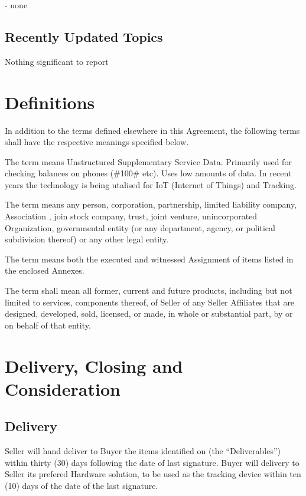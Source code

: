 \documentclass[letterpaper,10pt,english]{sphinxmanual}
\begin{document}
 - none


\subsection{Recently Updated Topics}
\label{\detokenize{releasenotes:recently-updated-topics}}
Nothing significant to report


\section{Definitions}
\label{\detokenize{1-definitions:definitions}}\label{\detokenize{1-definitions::doc}}
In addition to the terms defined elsewhere in this Agreement, the following terms shall have the respective meanings specified below.

The term  means Unstructured Supplementary Service Data. Primarily used for checking balances on phones (\#100\# etc). Uses low amounts of data. In recent years the technology is being utalised for IoT (Internet of Things) and Tracking.

The term  means any person, corporation, partnership, limited liability company, Association , join stock company, trust, joint venture, unincorporated Organization, governmental entity (or any department, agency, or political subdivision thereof) or any other legal entity.

The term  means both the executed and witnessed Assignment of items listed in the enclosed Annexes.

The term  shall mean all former, current and future products, including but not limited to services, components thereof, of Seller of any Seller Affiliates that are designed, developed, sold, licensed, or made, in whole or substantial part, by or on behalf of that entity.


\section{Delivery, Closing and Consideration}
\label{\detokenize{2-delivery:delivery-closing-and-consideration}}\label{\detokenize{2-delivery::doc}}

\subsection{Delivery}
\label{\detokenize{2-delivery:delivery}}
Seller will hand deliver to Buyer the items identified on  (the “Deliverables”) within thirty (30) days following the date of last signature.
Buyer will delivery to Seller its prefered Hardware solution, to be used as the tracking device within ten (10) days of the date of the last signature.
\end{document}
